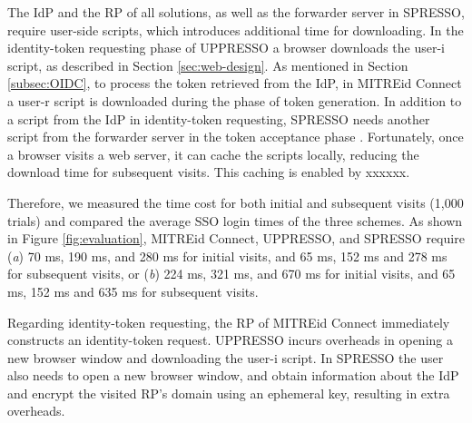 The IdP and the RP of all solutions, as well as the forwarder server in SPRESSO,
     require user-side scripts, which introduces additional time for downloading. 
In the identity-token requesting phase of UPPRESSO a browser downloads the user-i script,
    as described in Section \ref{sec:web-design}.
As mentioned in Section \ref{subsec:OIDC},
 to process the token retrieved from the IdP, %
    in MITREid Connect a user-r script is downloaded during the phase of token generation.
In addition to a script from the IdP in identity-token requesting,
SPRESSO needs another script from the forwarder server in the token acceptance phase \cite{SPRESSO}.
Fortunately, once a browser visits a web server, it can cache the scripts locally, reducing the download time for subsequent visits. This caching is enabled by xxxxxx.

Therefore, we measured the time cost for both initial and subsequent visits (1,000 trials) and compared the average SSO login times of the three schemes.
As shown in Figure \ref{fig:evaluation},
MITREid Connect, UPPRESSO, and SPRESSO require (\emph{a}) 70 ms, 190 ms, and 280 ms for initial visits, and 65 ms, 152 ms and 278 ms for subsequent visits,
 or (\emph{b}) 224 ms, 321 ms, and 670 ms for initial visits, and 65 ms, 152 ms and 635 ms for subsequent visits.

Regarding identity-token requesting, %
the RP of MITREid Connect immediately constructs an identity-token request. %
UPPRESSO incurs overheads in opening a new browser window and downloading the user-i script.
%
%
In SPRESSO the user also needs to open a new browser window, and obtain information about the IdP %
and encrypt the visited RP's domain using an ephemeral key, resulting in extra overheads.

